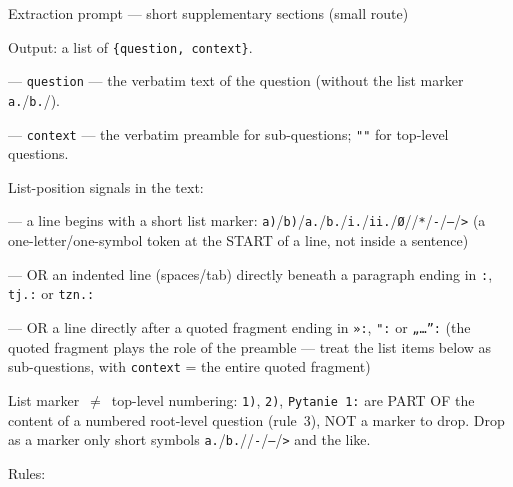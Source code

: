 \begin{promptbox}{Extraction prompt --- short supplementary sections (small route)}
{Output: a list of \texttt{\{question, context\}}.\par
--- \texttt{question} --- the verbatim text of the question (without the list marker \texttt{a.}/\texttt{b.}/\texttt{\textbullet}).\par
--- \texttt{context} --- the verbatim preamble for sub-questions; \texttt{""} for top-level questions.\par\smallskip
List-position signals in the text:\par
--- a line begins with a short list marker: \texttt{a)}/\texttt{b)}/\texttt{a.}/\texttt{b.}/\texttt{i.}/\texttt{ii.}/\texttt{Ø}/\texttt{\textbullet}/\texttt{*}/\texttt{-}/\texttt{--}/\texttt{>} (a one-letter/one-symbol token at the START of a line, not inside a sentence)\par
--- OR an indented line (spaces/tab) directly beneath a paragraph ending in \texttt{:}, \texttt{tj.:} or \texttt{tzn.:}\par
--- OR a line directly after a quoted fragment ending in \texttt{»:}, \texttt{":} or \texttt{„\ldots'':} (the quoted fragment plays the role of the preamble --- treat the list items below as sub-questions, with \texttt{context} = the entire quoted fragment)\par\smallskip
List marker~$\neq$~top-level numbering: \texttt{1)}, \texttt{2)}, \texttt{Pytanie~1:} are PART OF the content of a numbered root-level question (rule~3), NOT a marker to drop. Drop as a marker only short symbols \texttt{a.}/\texttt{b.}/\texttt{\textbullet}/\texttt{-}/\texttt{--}/\texttt{>} and the like.\par\smallskip
Rules:%
}




\end{promptbox}
